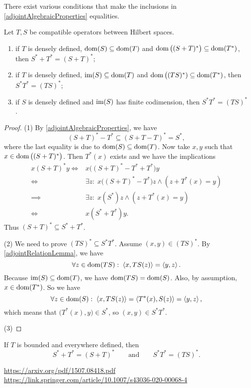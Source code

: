 There exist various conditions that make the inclusions in \ref{adjointAlgebraicProperties} equalities.
\begin{proposition} \label{equalityAlgebraicPropertiesAdjoint}
Let $T,S$ be compatible operators between Hilbert spaces.
\begin{enumerate}
\item if $T$ is densely defined, $\operatorname{dom}(S) \subseteq \operatorname{dom}(T)$ and $\operatorname{dom}\big((S+T)^*\big) \subseteq \operatorname{dom}(T^*)$, then $S^* + T^* = (S+T)^*$;
\item if $T$ is densely defined, $\operatorname{im}(S)\subseteq \operatorname{dom}(T)$ and $\operatorname{dom}\big((TS)^*)\subseteq \operatorname{dom}(T^*)$, then $S^*T^* = (TS)^*$;
\item if $S$ is densely defined and $\operatorname{im}(S)$ has finite codimension, then $S^*T^* = (TS)^*$.
\end{enumerate}
\end{proposition}
\begin{proof}
(1) By \ref{adjointAlgebraicProperties}, we have
\[ (S+T)^* - T^* \subseteq (S+T-T)^* = S^*, \]
where the last equality is due to $\operatorname{dom}(S) \subseteq \operatorname{dom}(T)$. Now take $x,y$ such that $x\in \operatorname{dom}\big((S+T)^*\big)$. Then $T^*(x)$ exists and we have the implications
\begin{align*}
x(S+T)^*y \iff& x\big((S+T)^* - T^* + T^*\big)y \\
\iff& \exists z: \; x\big((S+T)^* - T^*\big)z \land (z+T^*(x) = y) \\
\implies& \exists z: \; x(S^*)z \land (z+T^*(x) = y) \\
\iff& x(S^* + T^*)y.
\end{align*}
Thus $(S+T)^* \subseteq S^* + T^*$.

(2) We need to prove $(TS)^* \subseteq S^*T^*$. Assume $(x,y)\in (TS)^*$. By \ref{adjointRelationLemma}, we have
\[ \forall z\in \operatorname{dom}(TS):\; \left\langle x, TS(z) \right\rangle = \left\langle y, z \right\rangle. \]
Because $\operatorname{im}(S)\subseteq \operatorname{dom}(T)$, we have $\operatorname{dom}(TS) = \operatorname{dom}(S)$. Also, by assumption, $x\in \operatorname{dom}(T^*)$. So we have
\[ \forall z\in \operatorname{dom}(S):\; \left\langle x, TS(z) \right\rangle = \left\langle T^*(x), S(z) \right\rangle = \left\langle y, z \right\rangle, \]
which means that $\big(T^*(x), y\big)\in S^*$, so $(x,y)\in S^*T^*$.

(3)
\end{proof}
\begin{corollary}
If $T$ is bounded and everywhere defined, then
\[ S^* + T^* = (S+T)^* \qquad\text{and}\qquad S^*T^* = (TS)^*. \]
\end{corollary}

\url{https://arxiv.org/pdf/1507.08418.pdf}
\url{https://link.springer.com/article/10.1007/s43036-020-00068-4}

